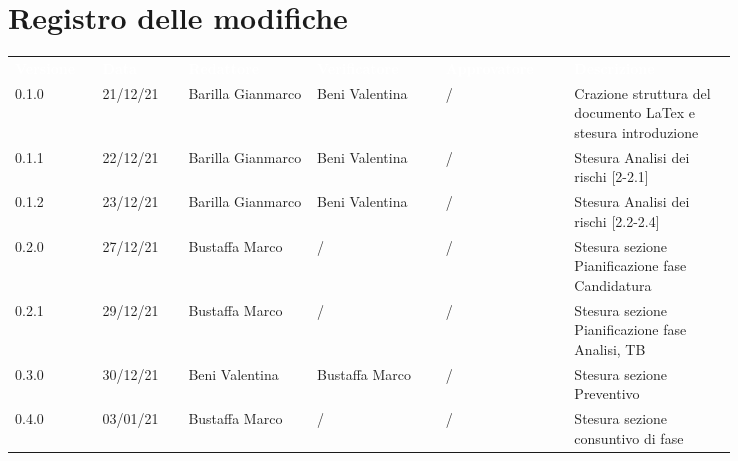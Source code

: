 \section*{Registro delle modifiche}

{\renewcommand{\arraystretch}{1.5}
\scriptsize
\begin{tabular}{p{0.10\linewidth}p{0.10\linewidth}p{0.15\linewidth}p{0.15\linewidth}p{0.15\linewidth}p{0.19\linewidth}}
	\rowcolor[RGB]{33, 73, 50}
	\textcolor{white}{\textbf{Versione}} & \textcolor{white}{\textbf{Data}} &
	\textcolor{white}{\textbf{Redattore}} & \textcolor{white}{\textbf{Verificatore}} &
	\textcolor{white}{\textbf{Approvatore}} & \textcolor{white}{\textbf{Descrizione}}\\
	\rowcolor[RGB]{216, 235, 171}
	0.1.0 & 21/12/21 & Barilla Gianmarco & Beni Valentina & / & Crazione struttura del documento LaTex e stesura introduzione\\
	\rowcolor[RGB]{233, 245, 206}
	0.1.1 & 22/12/21 & Barilla Gianmarco & Beni Valentina & / & Stesura Analisi dei rischi [2-2.1]\\
	\rowcolor[RGB]{216, 235, 171}
	0.1.2 & 23/12/21 & Barilla Gianmarco& Beni Valentina & / & Stesura Analisi dei rischi [2.2-2.4]\\
	\rowcolor[RGB]{233, 245, 206}
	0.2.0 & 27/12/21 & Bustaffa Marco& / & / & Stesura sezione Pianificazione fase Candidatura\\
	\rowcolor[RGB]{216, 235, 171}
	0.2.1 & 29/12/21 & Bustaffa Marco& / & / & Stesura sezione Pianificazione fase Analisi, TB\\
	\rowcolor[RGB]{233, 245, 206}
	0.3.0 & 30/12/21 & Beni Valentina& Bustaffa Marco & / & Stesura sezione Preventivo\\
	\rowcolor[RGB]{216, 235, 171}
	0.4.0 & 03/01/21 & Bustaffa Marco& / & / & Stesura sezione consuntivo di fase\\
\end{tabular}	
}